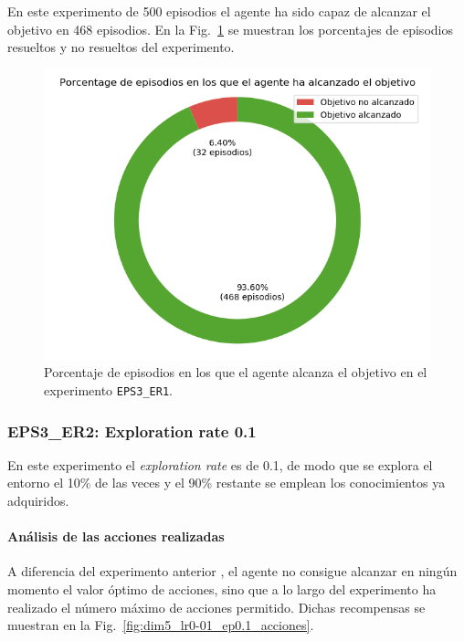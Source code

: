 En este experimento de 500 episodios el agente ha sido capaz de alcanzar el objetivo en 468 episodios. En la Fig.~\ref{fig:dim5_lr0.01_ep0_porcentajeResuelto} se muestran los porcentajes de episodios resueltos y no resueltos del experimento. 
\begin{figure}
    \centering
    \includegraphics[scale=0.4]{cap5_experimentacion/images/dim5_lr0.01_ep0_porcentajeResuelto.png}
    \caption{Porcentaje de episodios en los que el agente alcanza el objetivo en el experimento \texttt{EPS3\_ER1}.}
    \label{fig:dim5_lr0.01_ep0_porcentajeResuelto}
\end{figure}

\subsubsection{EPS3\_ER2: Exploration rate 0.1} \label{EPS3_ER2}

En este experimento el \textit{exploration rate} es de 0.1, de modo que se explora el entorno el 10\% de las veces y el 90\% restante se emplean los conocimientos ya adquiridos. \\

\paragraph{Análisis de las acciones realizadas}

A diferencia del experimento anterior , el agente no consigue alcanzar en ningún momento el valor óptimo de acciones, sino que a lo largo del experimento ha realizado el número máximo de acciones permitido. Dichas recompensas se muestran en la Fig.~\ref{fig:dim5_lr0-01_ep0.1_acciones}. \\

